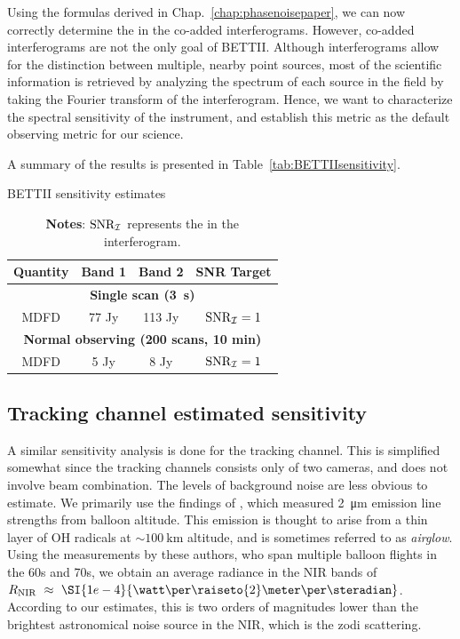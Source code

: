 Using the formulas derived in Chap.~\ref{chap:phasenoisepaper}, we can now correctly determine the \SNR in the co-added interferograms. However, co-added interferograms are not the only goal of BETTII. Although interferograms allow for the distinction between multiple, nearby point sources, most of the scientific information is retrieved by analyzing the spectrum of each source in the field by taking the Fourier transform of the interferogram. Hence, we want to characterize the spectral sensitivity of the instrument, and establish this metric as the default observing metric for our science.

A summary of the results is presented in Table~\ref{tab:BETTIIsensitivity}.

\begin{table}[ht!]
\begin{center}
\caption{BETTII sensitivity estimates}
\label{tab:BETTIIsensitivity}
\vspace{-0.5cm}
\begin{longtable}{cccc}
\toprule
  Quantity   & Band 1 &  Band 2 & SNR Target \\
     \midrule 
 \multicolumn{4}{c}{\textbf{Single scan (\SI{3}{\second})}} \\
MDFD & 77 Jy  & 113 Jy & $\textrm{SNR}_{\mathcal{I}} = 1$\\ 
\midrule
\multicolumn{4}{c}{\textbf{Normal observing (200 scans, 10 min)}} \\
MDFD & 5 Jy  & 8 Jy & $\textrm{SNR}_{\mathcal{I}} = 1$\\ 
\bottomrule 
\end{longtable} 
\caption*{\textbf{Notes}: $\textrm{SNR}_{\mathcal{I}}$ represents the \SNR in the interferogram.}
\end{center}
\end{table} 


\subsection{Tracking channel estimated sensitivity}
A similar sensitivity analysis is done for the tracking channel. This is simplified somewhat since the tracking channels consists only of two cameras, and does not involve beam combination. The levels of background noise are less obvious to estimate. We primarily use the findings of \citet{Matsumoto:1994io}, which measured \SI{2}{\micro\meter} emission line strengths from balloon altitude. This emission is thought to arise from a thin layer of OH radicals at $\sim\SI{100}{\kilo\meter}$ altitude, and is sometimes referred to as \textit{airglow}. Using the measurements by these authors, who span multiple balloon flights in the 60s and 70s, we obtain an average radiance in the NIR bands of $\Rnir~\approx~\SI{1e-4}{\watt\per\raiseto{2}\meter\per\steradian}$. According to our estimates, this is two orders of magnitudes lower than the brightest astronomical noise source in the NIR, which is the zodi scattering.

